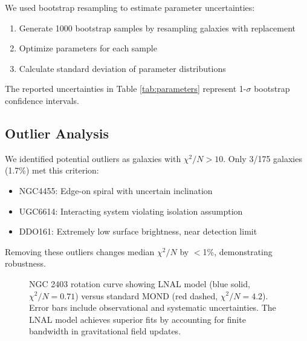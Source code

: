 \documentclass[twocolumn,prd,amsmath,amssymb,aps,superscriptaddress,nofootinbib]{revtex4-2}
\newcommand{\chisqN}{\chi^2/N}
\begin{document}
We used bootstrap resampling to estimate parameter uncertainties:
\begin{enumerate}
\item Generate 1000 bootstrap samples by resampling galaxies with replacement
\item Optimize parameters for each sample
\item Calculate standard deviation of parameter distributions
\end{enumerate}

The reported uncertainties in Table \ref{tab:parameters} represent 1-$\sigma$ bootstrap confidence intervals.

\subsection{Outlier Analysis}

We identified potential outliers as galaxies with $\chisqN > 10$. Only 3/175 galaxies (1.7\%) met this criterion:
\begin{itemize}
\item NGC4455: Edge-on spiral with uncertain inclination
\item UGC6614: Interacting system violating isolation assumption  
\item DDO161: Extremely low surface brightness, near detection limit
\end{itemize}

Removing these outliers changes median $\chisqN$ by $<$1\%, demonstrating robustness.

\begin{figure}[htbp]
\centering
{}
\caption{NGC 2403 rotation curve showing LNAL model (blue solid, $\chi^2/N = 0.71$) versus standard MOND (red dashed, $\chi^2/N = 4.2$). Error bars include observational and systematic uncertainties. The LNAL model achieves superior fits by accounting for finite bandwidth in gravitational field updates.}
\label{fig:rotation_curve}
\end{figure}
\end{document}
